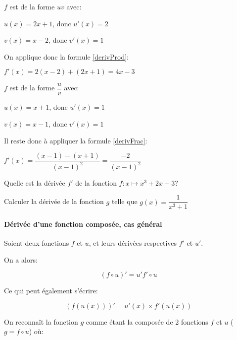 \documentclass[a4paper,12pt]{scrartcl}
\begin{document}
\begin{multicols}{2}

$f$ est de la forme $uv$ avec:

$u(x) = 2x+1$, donc $u'(x) = 2$

$v(x) = x-2$, donc $v'(x) = 1$

On applique donc la formule \ref{derivProd}:

$f'(x) = 2(x-2) + (2x+1) = 4x-3$


$f$ est de la forme $\dfrac{u}{v}$ avec:

$u(x) = x+1$, donc $u'(x) = 1$

$v(x) = x-1$, donc $v'(x) = 1$

Il reste donc à appliquer la formule \ref{derivFrac}:

$f'(x) = \dfrac{(x-1)-(x+1)}{(x-1)^2} = \dfrac{-2}{(x-1)^2}$ 
\end{multicols}

Quelle est la dérivée $f'$ de la fonction $f:x \longmapsto x^3 + 2x - 3$?


Calculer la dérivée de la fonction $g$ telle que $g(x) = \dfrac{1}{x^3+1}$


\paragraph{Dérivée d'une fonction composée, cas général}

Soient deux fonctions $f$ et $u$, et leurs dérivées respectives $f'$ et $u'$.

On a alors:

\begin{equation}
 (f \circ u)' = u' f'\circ u
 \label{eq:compo}
\end{equation}

Ce qui peut également s'écrire:

\begin{equation}
 (f(u(x)))' = u'(x) \times f'(u(x))
 \label{eq:compox}
\end{equation}


On reconnaît la fonction $g$ comme étant la composée de 2 fonctions $f$ et $u$ ($g = f \circ u$) où:
\end{document}
